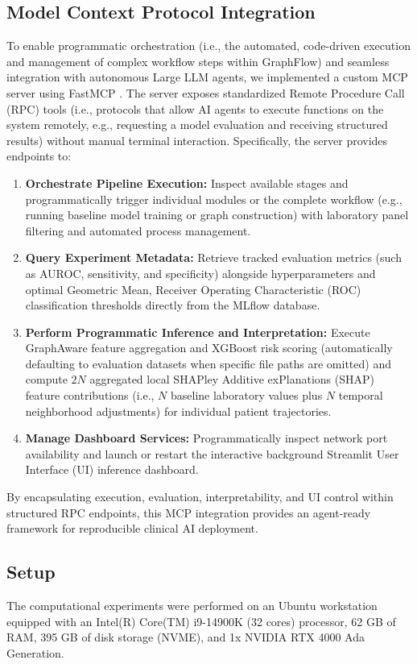 \documentclass[pdflatex,sn-mathphys-num,lineno]{sn-jnl}
\theoremstyle{thmstyleone}%
\theoremstyle{thmstyletwo}%
\theoremstyle{thmstylethree}%
\begin{document}
\subsection{Model Context Protocol Integration}\label{methods:mcp}
To enable programmatic orchestration (i.e., the automated, code-driven execution and management of complex workflow steps within GraphFlow) and seamless integration with autonomous Large LLM agents, we implemented a custom MCP \cite{modelcontextprotocol} server using FastMCP \cite{fastmcp2024}. The server exposes standardized Remote Procedure Call (RPC) tools (i.e., protocols that allow AI agents to execute functions on the system remotely, e.g., requesting a model evaluation and receiving structured results) without manual terminal interaction. Specifically, the server provides endpoints to:
\begin{enumerate}
    \item \textbf{Orchestrate Pipeline Execution:} Inspect available stages and programmatically trigger individual modules or the complete workflow (e.g., running baseline model training or graph construction) with laboratory panel filtering and automated process management.
    \item \textbf{Query Experiment Metadata:} Retrieve tracked evaluation metrics (such as AUROC, sensitivity, and specificity) alongside hyperparameters and optimal Geometric Mean, Receiver Operating Characteristic (ROC) classification thresholds directly from the MLflow database.
    \item \textbf{Perform Programmatic Inference and Interpretation:} Execute GraphAware feature aggregation and XGBoost risk scoring (automatically defaulting to evaluation datasets when specific file paths are omitted) and compute $2N$ aggregated local SHAPley Additive exPlanations (SHAP) \cite{NIPS2017_7062} feature contributions (i.e., $N$ baseline laboratory values plus $N$ temporal neighborhood adjustments) for individual patient trajectories.
    \item \textbf{Manage Dashboard Services:} Programmatically inspect network port availability and launch or restart the interactive background Streamlit User Interface (UI) inference dashboard.
\end{enumerate}
By encapsulating execution, evaluation, interpretability, and UI control within structured RPC endpoints, this MCP integration provides an agent-ready framework for reproducible clinical AI deployment.

\subsection{Setup}\label{methods:setup}
The computational experiments were performed on an Ubuntu workstation equipped with an Intel(R) Core(TM) i9-14900K (32 cores) processor, 62 GB of RAM, 395 GB of disk storage (NVME), and 1x NVIDIA RTX 4000 Ada Generation.
\end{document}
